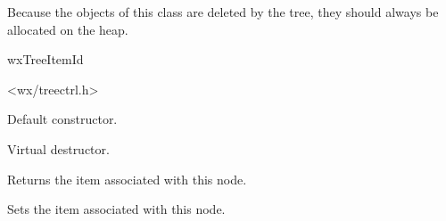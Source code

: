 Because the objects of this class are deleted by the tree, they should
always be allocated on the heap.


wxTreeItemId


<wx/treectrl.h>




\label{wxtreeitemdataconstr}


Default constructor.



Virtual destructor.

\label{wxtreeitemdatagetid}


Returns the item associated with this node.

\label{wxtreeitemdatasetid}


Sets the item associated with this node.

